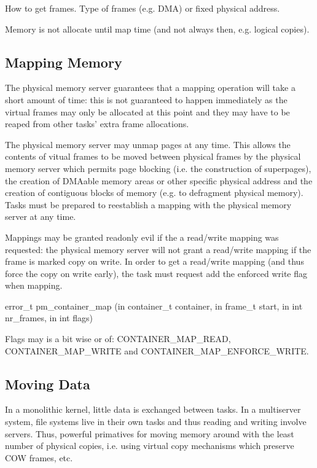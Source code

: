 How to get frames.  Type of frames (e.g. DMA) or fixed physical address.

Memory is not allocate until map time (and not always then,
e.g. logical copies).

\subsection{Mapping Memory}

The physical memory server guarantees that a mapping operation will
take a short amount of time: this is not guaranteed to happen
immediately as the virtual frames may only be allocated at this point
and they may have to be reaped from other tasks' extra frame
allocations.

The physical memory server may unmap pages at any time.  This allows
the contents of vitual frames to be moved between physical frames by
the physical memory server which permits page blocking (i.e. the
construction of superpages), the creation of DMAable memory areas or
other specific physical address and the creation of contiguous blocks
of memory (e.g. to defragment physical memory).  Tasks must be
prepared to reestablish a mapping with the physical memory server at
any time.

Mappings may be granted readonly evil if the a read/write mapping was
requested: the physical memory server will not grant a read/write
mapping if the frame is marked copy on write.  In order to get a
read/write mapping (and thus force the copy on write early), the task
must request add the enforced write flag when mapping.

\begin{code}
error\_t pm\_container\_map (in container\_t container, in frame\_t
start, in int nr\_frames, in int flags)
\end{code}

\noindent
Flags may is a bit wise or of: CONTAINER\_MAP\_READ,
CONTAINER\_MAP\_WRITE and CONTAINER\_MAP\_ENFORCE\_WRITE.

\subsection{Moving Data}

In a monolithic kernel, little data is exchanged between tasks.  In a
multiserver system, file systems live in their own tasks and thus
reading and writing involve servers.  Thus, powerful primatives for
moving memory around with the least number of physical copies,
i.e. using virtual copy mechanisms which preserve COW frames, etc.

